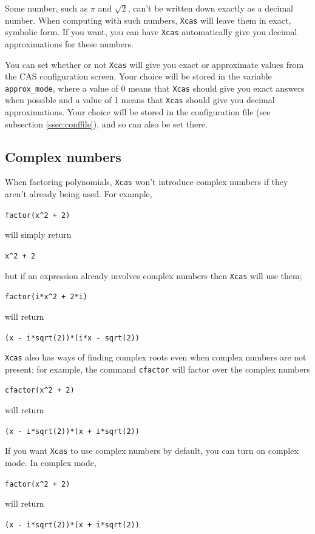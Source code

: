 \documentclass[a4paper,11pt]{book}
\begin{document}
Some number, such as $\pi$ and $\sqrt{2}$, can't be written down
exactly as a decimal number.  When computing with such numbers,
\texttt{Xcas} will leave them in exact, symbolic form.  If you want,
you can have \texttt{Xcas} automatically give you decimal
approximations for these numbers.

You can set whether or not \texttt{Xcas} will give you exact or
approximate values from the CAS configuration screen.  Your choice will
be stored in the variable \texttt{approx\_mode}, where a value of 0
means that \texttt{Xcas} should give you exact answers when possible
and a value of 1 means that \texttt{Xcas} should give you decimal
approximations.  Your choice will be stored in the configuration file
(see subsection \ref{ssec:conffile}), and so can also be set there.

\subsection{Complex numbers}
\label{ssec:complex}

When factoring polynomials, \texttt{Xcas} won't introduce complex
numbers if they aren't already being used.  For example,
\begin{center}
  \texttt{factor(x\^{}2 + 2)}
\end{center}
will simply return
\begin{center}
  \texttt{x\^{}2 + 2}
\end{center}
but if an expression already involves complex numbers then
\texttt{Xcas} will use them;
\begin{center}
  \texttt{factor(i*x\^{}2 + 2*i)}
\end{center}
will return
\begin{center}
  \texttt{(x - i*sqrt(2))*(i*x - sqrt(2))}
\end{center}
\texttt{Xcas} also has ways of finding complex roots even when complex
numbers are not present; for example, the command \texttt{cfactor}
will factor over the complex numbers
\begin{center}
  \texttt{cfactor(x\^{}2 + 2)}
\end{center}
will return
\begin{center}
  \texttt{(x - i*sqrt(2))*(x + i*sqrt(2))}
\end{center}

If you want \texttt{Xcas} to use complex numbers by default, you can
turn on complex mode.  In complex mode,
\begin{center}
  \texttt{factor(x\^{}2 + 2)}
\end{center}
will return
\begin{center}
  \texttt{(x - i*sqrt(2))*(x + i*sqrt(2))}
\end{center}
\end{document}
